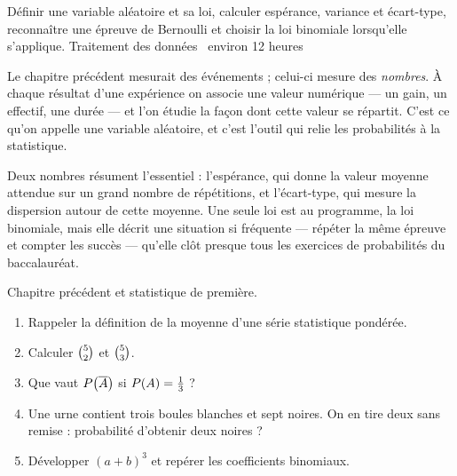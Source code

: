   {Définir une variable aléatoire et sa loi, calculer espérance, variance et
   écart-type, reconnaître une épreuve de Bernoulli et choisir la loi
   binomiale lorsqu'elle s'applique.}
  {Traitement des données \textbullet\ environ 12 heures}

Le chapitre précédent mesurait des événements ; celui-ci mesure des
\emph{nombres}. À chaque résultat d'une expérience on associe une valeur
numérique — un gain, un effectif, une durée — et l'on étudie la façon dont
cette valeur se répartit. C'est ce qu'on appelle une variable aléatoire, et
c'est l'outil qui relie les probabilités à la statistique.

Deux nombres résument l'essentiel : l'espérance, qui donne la valeur moyenne
attendue sur un grand nombre de répétitions, et l'écart-type, qui mesure la
dispersion autour de cette moyenne. Une seule loi est au programme, la loi
binomiale, mais elle décrit une situation si fréquente — répéter la même
épreuve et compter les succès — qu'elle clôt presque tous les exercices de
probabilités du baccalauréat.

\begin{revision}
Chapitre précédent et statistique de première.

\begin{enumerate}[label=\textbf{\arabic*.}, leftmargin=*, itemsep=0.35em]
  \item Rappeler la définition de la moyenne d'une série statistique
        pondérée.
  \item Calculer $\combi{2}{5}$ et $\combi{3}{5}$.
  \item Que vaut $\proba{\evtc{A}}$ si $\proba{A} = \frac13$ ?
  \item Une urne contient trois boules blanches et sept noires. On en tire
        deux sans remise : probabilité d'obtenir deux noires ?
  \item Développer $(a+b)^{3}$ et repérer les coefficients binomiaux.
\end{enumerate}
\end{revision}

